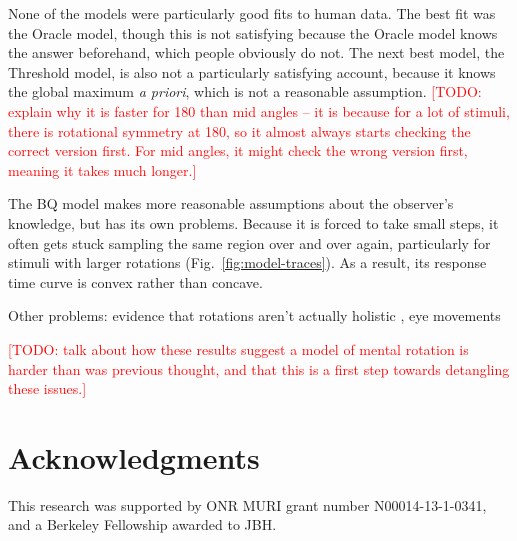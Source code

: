 \documentclass[10pt,letterpaper]{article}
\newcommand{\TODO}[1]{\textcolor{red}{[TODO: #1]}}
\newcommand{\Oc}[0]{Oracle}
\newcommand{\Th}[0]{Threshold}
\newcommand{\Bq}[0]{BQ}
\begin{document}
None of the models were particularly good fits to human data. The best
fit was the \Oc{} model, though this is not satisfying because the
\Oc{} model knows the answer beforehand, which people obviously do
not. The next best model, the \Th{} model, is also not a
particularly satisfying account, because it knows the global maximum
\textit{a priori}, which is not a reasonable assumption. \TODO{explain
  why it is faster for 180 than mid angles -- it is because for a lot
  of stimuli, there is rotational symmetry at 180, so it almost always
  starts checking the correct version first. For mid angles, it might
  check the wrong version first, meaning it takes much longer.}

The \Bq{} model makes more reasonable assumptions about the observer's
knowledge, but has its own problems. Because it is forced to take
small steps, it often gets stuck sampling the same region over and
over again, particularly for stimuli with larger rotations
(Fig.~\ref{fig:model-traces}). As a result, its response time curve is
convex rather than concave.

Other problems: evidence that rotations aren't actually holistic
\cite{Yuille:1982tx}, eye movements \cite{Just1976}

\TODO{talk about how these results suggest a model of mental rotation
  is harder than was previous thought, and that this is a first step
  towards detangling these issues.}

\section{Acknowledgments}

This research was supported by ONR MURI grant number N00014-13-1-0341,
and a Berkeley Fellowship awarded to JBH.



\setlength{\bibleftmargin}{.125in}
\setlength{\bibindent}{-\bibleftmargin}


\end{document}
